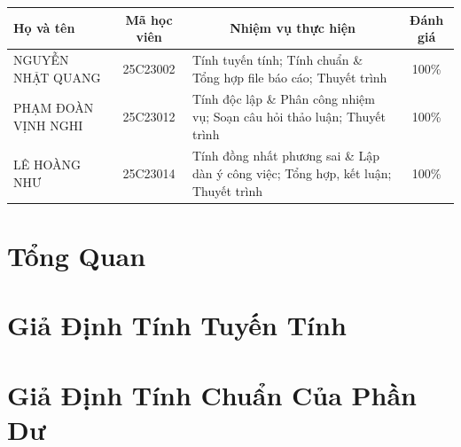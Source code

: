 \documentclass[12pt, a4paper]{article}
\begin{document}
\begin{table}[h]
  \centering
  \small
  \renewcommand{\arraystretch}{1.4}
  \begin{tabularx}{\textwidth}{|l|c|X|c|}
    \hline
    \textbf{Họ và tên} & \textbf{Mã học viên} & \multicolumn{1}{c|}{\textbf{Nhiệm vụ thực hiện}} & \textbf{Đánh giá} \\
    \hline
    NGUYỄN NHẬT QUANG & 25C23002 & Tính tuyến tính; Tính chuẩn \& Tổng hợp file báo cáo; Thuyết trình & 100\% \\ \hline
    PHẠM ĐOÀN VỊNH NGHI & 25C23012 & Tính độc lập \& Phân công nhiệm vụ; Soạn câu hỏi thảo luận; Thuyết trình & 100\% \\ \hline
    LÊ HOÀNG NHƯ & 25C23014 & Tính đồng nhất phương sai \& Lập dàn ý công việc; Tổng hợp, kết luận; Thuyết trình & 100\% \\
    \hline
  \end{tabularx}
\end{table}

\newpage
\tableofcontents
\newpage

\section{Tổng Quan}



\section{Giả Định Tính Tuyến Tính}










\section{Giả Định Tính Chuẩn Của Phần Dư}
\end{document}
